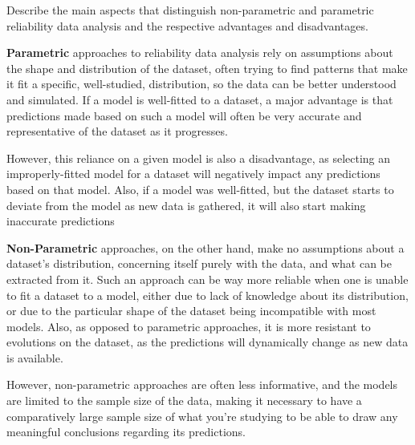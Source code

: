 \documentclass{article}
\begin{document}
\begin{question}
    Describe the main aspects that distinguish non-parametric and parametric reliability data analysis and the respective advantages and disadvantages.
\end{question}

\textbf{Parametric} approaches to reliability data analysis rely on assumptions about the shape and distribution of the dataset, often trying to find patterns that make it fit a specific, well-studied, distribution, so the data can be better understood and simulated. If a model is well-fitted to a dataset, a major advantage is that predictions made based on such a model will often be very accurate and representative of the dataset as it progresses.\par
However, this reliance on a given model is also a disadvantage, as selecting an improperly-fitted model for a dataset will negatively impact any predictions based on that model. Also, if a model was well-fitted, but the dataset starts to deviate from the model as new data is gathered, it will also start making inaccurate predictions\par
\textbf{Non-Parametric} approaches, on the other hand, make no assumptions about a dataset's distribution, concerning itself purely with the data, and what can be extracted from it. Such an approach can be way more reliable when one is unable to fit a dataset to a model, either due to lack of knowledge about its distribution, or due to the particular shape of the dataset being incompatible with most models. Also, as opposed to parametric approaches, it is more resistant to evolutions on the dataset, as the predictions will dynamically change as new data is available.\par
However, non-parametric approaches are often less informative, and the models are limited to the sample size of the data, making it necessary to have a comparatively large sample size of what you're studying to be able to draw any meaningful conclusions regarding its predictions.

\end{document}
